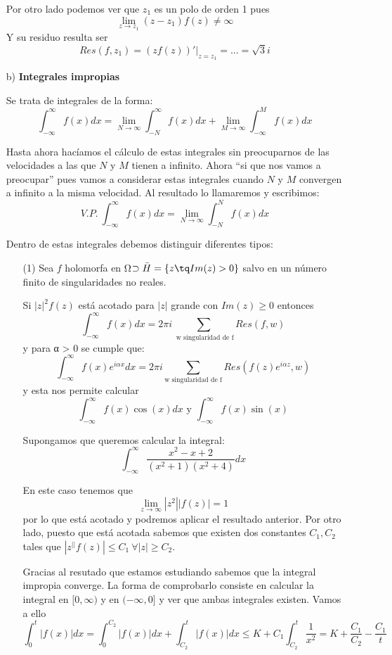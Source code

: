 \documentclass{apuntes}
\begin{document}
\begin{enumerate}
\begin{example}
Por otro lado podemos ver que $z_1$ es un polo de orden 1 pues
\[\lim_{z \to z_1} (z-z_1)f(z) \neq \infty\]
Y su residuo resulta ser
\[Res(f,z_1)=\left. \left(zf(z)\right)'\right|_{z=z_1} = ... = \sqrt{3}i\]
\end{example}

\item[b)] \textbf{Integrales impropias}

Se trata de integrales de la forma:
\[\int_{-\infty}^{\infty} f(x)dx = \lim_{N \to \infty}\int_{-N}^{\infty}f(x)dx + \lim_{M \to \infty} \int_{-\infty}^{M} f(x)dx\]

Hasta ahora hacíamos el cálculo de estas integrales sin preocuparnos de las velocidades a las que $N$ y $M$ tienen a infinito. Ahora ``si que nos vamos a preocupar'' pues vamos a considerar estas integrales cuando $N$ y $M$ convergen a infinito a la misma velocidad. Al resultado lo llamaremos  y escribimos:
\[V.P. \ \int_{-\infty}^{\infty} f(x)dx = \lim_{N \to \infty}\int_{-N}^N f(x)dx\]

Dentro de estas integrales debemos distinguir diferentes tipos:
\begin{enumerate}
\item[(1)] Sea $f$ holomorfa en Ω$\supset \bar{H}=\{z \tq Im(z)>0\}$ salvo en un número finito de singularidades no reales.

Si $|z|^2f(z)$ está acotado para $|z|$ grande con $Im(z)\geq 0$ entonces
\[\int_{-\infty}^{\infty}f(x)dx = 2πi \sum_{\text{ w singularidad de f}}Res(f,w)\]
y para α > 0 se cumple que:
\[\int_{-\infty}^{\infty} f(x)e^{iαx}dx = 2πi \sum_{\text{w singularidad de f}}Res(f(z)e^{iαz},w)\]
y esta nos permite calcular
\[\int_{-\infty}^{\infty} f(x)\cos(x)dx \text{ y } \int_{-\infty}^{\infty}f(x)\sin(x)\]

\begin{example}
Supongamos que queremos calcular la integral:
\[\int_{-\infty}^{\infty} \frac{x^2-x+2}{(x^2+1)(x^2+4)}dx\]

En este caso tenemos que
\[\lim_{z \to \infty} |z^2||f(z)|=1\]
por lo que está acotado y podremos aplicar el resultado anterior. Por otro lado, puesto que está acotada sabemos que existen dos constantes $C_1, C_2$ tales que $|z^||f(z)|\leq C_1 \ \forall |z|  \geq C_2$.

Gracias al resutado que estamos estudiando sabemos que la integral impropia converge. La forma de comprobarlo consiste en calcular la integral en $[0,\infty)$ y en $(-\infty, 0]$ y ver que ambas integrales existen. Vamos a ello
\[\int_0^t |f(x)|dx = \int_0^{C_2}|f(x)|dx + \int_{C_2}^t |f(x)|dx \leq K+C_1\int_{C_2}^t \frac{1}{x^2}=K+\frac{C_1}{C_2}-\frac{C_1}{t}\]


\end{example}
\end{enumerate}
\end{enumerate}
\end{document}
